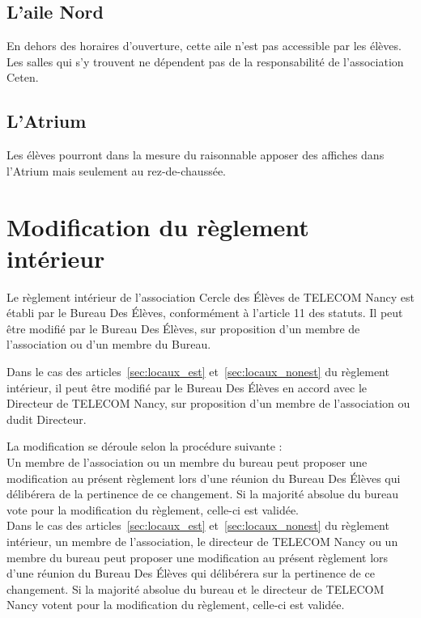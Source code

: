 \documentclass{article} %
\begin{document}
		\subsection{L’aile Nord}

			En dehors des horaires d’ouverture, cette aile n’est pas accessible
			par les élèves. Les salles qui s’y trouvent ne dépendent pas de la
			responsabilité de l'association Ceten.

		\subsection{L’Atrium}

			Les élèves pourront dans la mesure du raisonnable apposer des
			affiches dans l’Atrium mais seulement au rez-de-chaussée.

	\section{Modification du règlement intérieur}
\label{sec:modif}

		Le règlement intérieur de l’association Cercle des Élèves de TELECOM
		Nancy est établi par le Bureau Des Élèves, conformément à l'article 11
		des statuts. Il peut être modifié par le Bureau Des Élèves, sur
		proposition d’un membre de l’association ou d’un membre du Bureau.

		Dans le cas des articles~\ref{sec:locaux_est} et~\ref{sec:locaux_nonest}
		du règlement intérieur, il peut être modifié par le Bureau Des Élèves en
		accord avec le Directeur de TELECOM Nancy, sur proposition d’un membre
		de l’association ou dudit Directeur.

		La modification se déroule selon la procédure suivante : \\
		Un membre de l’association ou un membre du bureau peut proposer une
		modification au présent règlement lors d’une réunion du Bureau Des
		Élèves qui délibérera de la pertinence de ce changement. Si la majorité
		absolue du bureau vote pour la modification du règlement, celle-ci est
		validée. \\
		Dans le cas des articles~\ref{sec:locaux_est} et~\ref{sec:locaux_nonest}
		du règlement intérieur, un membre de l’association, le directeur de
		TELECOM Nancy ou un membre du bureau peut proposer une modification au
		présent règlement lors d’une réunion du Bureau Des Élèves qui délibérera
		sur la pertinence de ce changement. Si la majorité absolue du bureau et
		le directeur de TELECOM Nancy votent pour la modification du règlement,
		celle-ci est validée.
\end{document}
